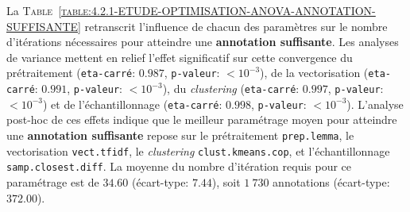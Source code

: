 			La \textsc{Table~\ref{table:4.2.1-ETUDE-OPTIMISATION-ANOVA-ANNOTATION-SUFFISANTE}} retranscrit l'influence de chacun des paramètres sur le nombre d'itérations nécessaires pour atteindre une \textbf{annotation suffisante}.
			Les analyses de variance mettent en relief l'effet significatif sur cette convergence du prétraitement (\texttt{eta-carré}: $0.987$, \texttt{p-valeur}: $< 10^{-3}$), de la vectorisation (\texttt{eta-carré}: $0.991$, \texttt{p-valeur}: $< 10^{-3}$), du \textit{clustering} (\texttt{eta-carré}: $0.997$, \texttt{p-valeur}: $< 10^{-3}$) et de l'échantillonnage (\texttt{eta-carré}: $0.998$, \texttt{p-valeur}: $< 10^{-3}$).
			L'analyse post-hoc de ces effets indique que le meilleur paramétrage moyen pour atteindre une \textbf{annotation suffisante} repose sur le prétraitement \texttt{prep.lemma}, le vectorisation \texttt{vect.tfidf}, le \textit{clustering} \texttt{clust.kmeans.cop}, et l'échantillonnage \texttt{samp.closest.diff}. La moyenne du nombre d'itération requis pour ce paramétrage est de $34.60$ (écart-type: $7.44$), soit $1~730$ annotations (écart-type: $372.00$).
